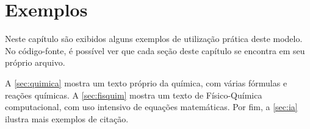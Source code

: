 \chapter{Exemplos} \label{part:exemplos}

Neste capítulo são exibidos alguns exemplos de utilização prática deste modelo. No código-fonte, é possível ver que cada seção deste capítulo se encontra em seu próprio arquivo.

A \autoref{sec:quimica} mostra um texto próprio da química, com várias fórmulas e reações químicas.
A \autoref{sec:fisquim} mostra um texto de Físico-Química computacional, com uso intensivo de equações matemáticas.
Por fim, a \autoref{sec:ia} ilustra mais exemplos de citação.











